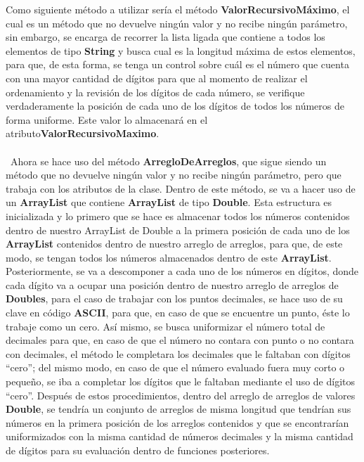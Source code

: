 \documentclass[12pt,letterpaper]{report}
\begin{document}
Como siguiente método a utilizar sería el método \textbf{ValorRecursivoMáximo}, el cual es un método que no devuelve ningún valor y no recibe ningún parámetro, sin embargo, se encarga de recorrer la lista ligada que contiene a todos los elementos de tipo \textbf{String} y busca cual es la longitud máxima de estos elementos, para que, de esta forma, se tenga un control sobre cuál es el número que cuenta con una mayor cantidad de dígitos para que al momento de realizar el ordenamiento y la revisión de los dígitos de cada número, se verifique verdaderamente la posición de cada uno de los dígitos de todos los números de forma uniforme. Este valor lo almacenará en el atributo\textbf{ValorRecursivoMaximo}.\\\\\
Ahora se hace uso del método \textbf{ArregloDeArreglos}, que sigue siendo un método que no devuelve ningún valor y no recibe ningún parámetro, pero que trabaja con los atributos de la clase. Dentro de este método, se va a hacer uso de un \textbf{ArrayList} que contiene \textbf{ArrayList} de tipo \textbf{Double}. Esta estructura es inicializada y lo primero que se hace es almacenar todos los números contenidos dentro de nuestro ArrayList de Double a la primera posición de cada uno de los \textbf{ArrayList} contenidos dentro de nuestro arreglo de arreglos, para que, de este modo, se tengan todos los números almacenados dentro de este \textbf{ArrayList}. Posteriormente, se va a descomponer a cada uno de los números en dígitos, donde cada dígito va a ocupar una posición dentro de nuestro arreglo de arreglos de \textbf{Doubles}, para el caso de trabajar con los puntos decimales, se hace uso de su clave en código \textbf{ASCII}, para que, en caso de que se encuentre un punto, éste lo trabaje como un cero. Así mismo, se busca uniformizar el número total de decimales para que, en caso de que el número no contara con punto o no contara con decimales, el método le completara los decimales que le faltaban con dígitos “cero”; del mismo modo, en caso de que el número evaluado fuera muy corto o pequeño, se iba a completar los dígitos que le faltaban mediante el uso de dígitos “cero”. Después de estos procedimientos, dentro del arreglo de arreglos de valores \textbf{Double}, se tendría un conjunto de arreglos de misma longitud que tendrían sus números en la primera posición de los arreglos contenidos y que se encontrarían uniformizados con la misma cantidad de números decimales y la misma cantidad de dígitos para su evaluación dentro de funciones posteriores.\\\\\
\end{document}
